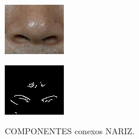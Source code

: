 \begin{figure}[h!]
    \caption{COMPONENTES conexos NARIZ.}
    \centering
    \begin{minipage}[b]{0.45\textwidth}
        \centering
        \includegraphics[width=0.9\linewidth]{fig/02_detected_nose.png}
        \label{fig:nariz}
    \end{minipage}
    \hfill
    \begin{minipage}[b]{0.45\textwidth}
        \centering
        \includegraphics[width=0.9\linewidth]{fig/03_nose_edge.png}
        \label{fig:canny-nariz}
    \end{minipage}


\end{figure}
